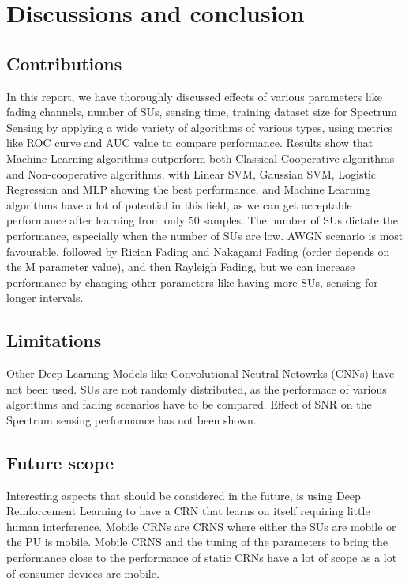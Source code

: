 \chapter{Discussions and conclusion}
\section{Contributions}
In this report, we have thoroughly discussed effects of various parameters like fading channels, number of SUs, sensing time, training dataset size for Spectrum Sensing by applying a wide variety of algorithms of various types, using metrics like ROC curve and AUC value to compare performance.
Results show that Machine Learning algorithms outperform both Classical Cooperative algorithms and Non-cooperative algorithms, with Linear SVM, Gaussian SVM, Logistic Regression and MLP showing the best performance, and Machine Learning algorithms have a lot of potential in this field, as we can get acceptable performance after learning from only 50 samples. The number of SUs dictate the performance, especially when the number of SUs are low. AWGN scenario is most favourable, followed by Rician Fading and Nakagami Fading (order depends on the M parameter value), and then Rayleigh Fading, but we can increase performance by changing other parameters like having more SUs, sensing for longer intervals. 


\section{Limitations}
Other Deep Learning Models like Convolutional Neutral Netowrks (CNNs) have not been used. SUs are not randomly distributed, as the performace of various algorithms and fading scenarios have to be compared. Effect of SNR on the Spectrum sensing performance has not been shown.


\section{Future scope}
Interesting aspects that should be considered in the future, is using Deep Reinforcement Learning to have a CRN that learns on itself requiring little human interference. Mobile CRNs are CRNS where either the SUs are mobile or the PU is mobile. Mobile CRNS and the tuning of the parameters to bring the performance close to the performance of static CRNs have a lot of scope as a lot of  consumer devices are mobile.